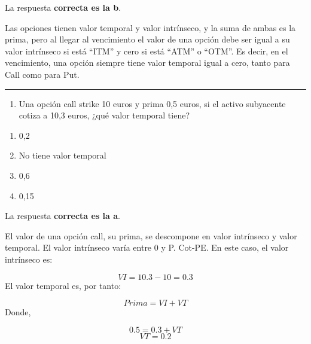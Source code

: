 \documentclass[
  letterpaper,
  DIV=11,
  numbers=noendperiod]{scrreprt}
\providecommand{\tightlist}{%
  \setlength{\itemsep}{0pt}\setlength{\parskip}{0pt}}\usepackage{longtable,booktabs,array}
\begin{document}
\begin{tcolorbox}[enhanced jigsaw, left=2mm, opacityback=0, colback=white, breakable, arc=.35mm, bottomrule=.15mm, rightrule=.15mm, toprule=.15mm, leftrule=.75mm, colframe=quarto-callout-tip-color-frame]
\begin{minipage}[t]{5.5mm}
\textcolor{quarto-callout-tip-color}{\faLightbulb}
\end{minipage}%
\begin{minipage}[t]{\textwidth - 5.5mm}

La respuesta \textbf{correcta es la b}.

Las opciones tienen valor temporal y valor intrínseco, y la suma de
ambas es la prima, pero al llegar al vencimiento el valor de una opción
debe ser igual a su valor intrínseco si está ``ITM'' y cero si está
``ATM'' o ``OTM''. Es decir, en el vencimiento, una opción siempre tiene
valor temporal igual a cero, tanto para Call como para Put.

\end{minipage}%
\end{tcolorbox}

\begin{center}\rule{0.5\linewidth}{0.5pt}\end{center}

\begin{enumerate}
\def\labelenumi{\arabic{enumi}.}
\setcounter{enumi}{50}
\tightlist
\item
  Una opción call strike 10 euros y prima 0,5 euros, si el activo
  subyacente cotiza a 10,3 euros, ¿qué valor temporal tiene?
\end{enumerate}

\begin{enumerate}
\def\labelenumi{\alph{enumi})}
\item
  0,2
\item
  No tiene valor temporal
\item
  0,6
\item
  0,15
\end{enumerate}

\begin{tcolorbox}[enhanced jigsaw, left=2mm, opacityback=0, colback=white, breakable, arc=.35mm, bottomrule=.15mm, rightrule=.15mm, toprule=.15mm, leftrule=.75mm, colframe=quarto-callout-tip-color-frame]
\begin{minipage}[t]{5.5mm}
\textcolor{quarto-callout-tip-color}{\faLightbulb}
\end{minipage}%
\begin{minipage}[t]{\textwidth - 5.5mm}

La respuesta \textbf{correcta es la a}.

El valor de una opción call, su prima, se descompone en valor intrínseco
y valor temporal. El valor intrínseco varía entre 0 y P. Cot-PE. En este
caso, el valor intrínseco es:

\[VI=10.3-10=0.3\] El valor temporal es, por tanto:

\[Prima = VI + VT\] Donde,

\[0.5 = 0.3 + VT\] \[VT= 0.2\]

\end{minipage}%
\end{tcolorbox}
\end{document}
